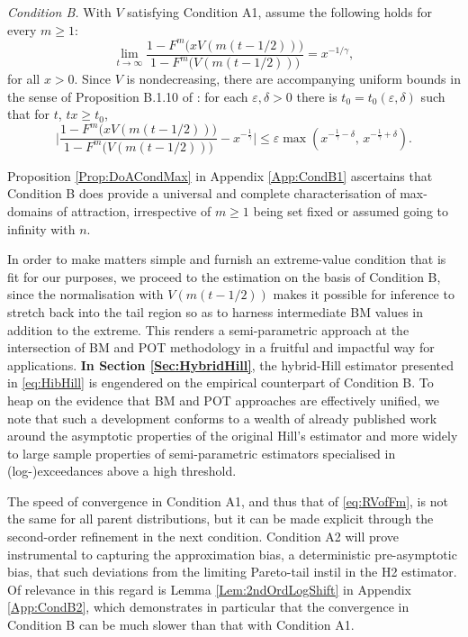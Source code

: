 \documentclass[11pt, a4paper, oneside]{article}
\numberwithin{equation}{section}
\theoremstyle{plain}
\theoremstyle{definition}
\begin{document}
\emph{Condition B.} With $V$ satisfying Condition A1, assume the following holds for every $m \geq 1$: 
\begin{equation}\label{eq:RVofFm}
    \lim_{t\rightarrow \infty} \frac{1-F^m\bigl( x V(m(t-1/2)) \bigr) }{ 1 - F^m \bigl( V(m(t-1/2)) \bigr)}= x^{-1/\gamma},
    \end{equation}
    for all $x>0$.
Since $V$ is nondecreasing, there are accompanying uniform bounds in the sense of Proposition B.1.10 of \citet{deHaanFerreira2006}: for each $\varepsilon,\delta>0$ there is $t_0= t_0(\varepsilon,\delta)$ such that for $t$, $tx\geq t_0$,
\begin{equation*}
    \biggl|\frac{1-F^m\bigl( x V(m(t-1/2)) \bigr) }{ 1 - F^m \bigl( V(m(t-1/2)) \bigr)}-x^{-\frac{1}{\gamma}}\biggl|\leq \varepsilon \max(x^{-\frac{1}{\gamma}-\delta}, \,x^{-\frac{1}{\gamma}+\delta}).
\end{equation*}

Proposition \ref{Prop:DoACondMax} in Appendix \ref{App:CondB1} ascertains that Condition B does provide a universal and complete characterisation of max-domains of attraction, irrespective of $m \geq 1$ being set fixed or assumed going to infinity with $n$. 

In order to make matters simple and furnish an extreme-value condition that is fit for our purposes, we proceed to the estimation on the basis of Condition B, since the normalisation with $V(m(t-1/2))$ makes it possible for inference to stretch back into the tail region so as to harness intermediate BM values in addition to the extreme. This renders a semi-parametric approach at the intersection of BM and POT methodology in a fruitful and impactful way for applications. \textbf{In Section \ref{Sec:HybridHill}}, the hybrid-Hill estimator presented in \eqref{eq:HibHill} is engendered on the empirical counterpart of Condition B. To heap on the evidence that BM and POT approaches are effectively unified, we note that such a development conforms to a wealth of already published work around the asymptotic properties of the original Hill's estimator \citep{Hill1975} and more widely to large sample properties of semi-parametric estimators specialised in (log-)exceedances above a high threshold.


 The speed of convergence in Condition A1, and thus that of \eqref{eq:RVofFm}, is not the same for all parent distributions, but it can be made explicit through the second-order refinement in the next condition. Condition A2 will prove instrumental to capturing the approximation bias, a deterministic pre-asymptotic bias, that such deviations from the limiting Pareto-tail instil in the H2 estimator. Of relevance in this regard is Lemma \ref{Lem:2ndOrdLogShift} in Appendix \ref{App:CondB2}, which demonstrates in particular that the convergence in Condition B can be much slower than that with Condition A1. 
 
\end{document}
